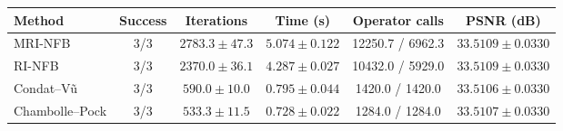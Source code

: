 \begin{tabular}{lccccc}\hline
Method & Success & Iterations & Time (s) & Operator calls & PSNR (dB) \\
\hline
MRI-NFB & 3/3 & $2783.3 \pm 47.3$ & $5.074 \pm 0.122$ & 12250.7 / 6962.3 & $33.5109 \pm 0.0330$ \\
RI-NFB & 3/3 & $2370.0 \pm 36.1$ & $4.287 \pm 0.027$ & 10432.0 / 5929.0 & $33.5109 \pm 0.0330$ \\
Condat--V{\~u} & 3/3 & $590.0 \pm 10.0$ & $0.795 \pm 0.044$ & 1420.0 / 1420.0 & $33.5106 \pm 0.0330$ \\
Chambolle--Pock & 3/3 & $533.3 \pm 11.5$ & $0.728 \pm 0.022$ & 1284.0 / 1284.0 & $33.5107 \pm 0.0330$ \\
\hline\end{tabular}
